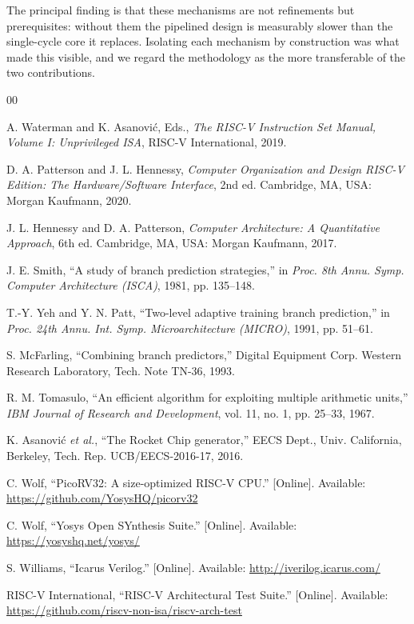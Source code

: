 \documentclass[conference]{IEEEtran}
\begin{document}
The principal finding is that these mechanisms are not refinements but
prerequisites: without them the pipelined design is measurably slower than
the single-cycle core it replaces. Isolating each mechanism by construction
was what made this visible, and we regard the methodology as the more
transferable of the two contributions.

\begin{thebibliography}{00}

 A. Waterman and K. Asanovi\'{c}, Eds., \emph{The RISC-V
Instruction Set Manual, Volume I: Unprivileged ISA}, RISC-V
International, 2019.

 D. A. Patterson and J. L. Hennessy, \emph{Computer
Organization and Design RISC-V Edition: The Hardware/Software Interface},
2nd ed. Cambridge, MA, USA: Morgan Kaufmann, 2020.

 J. L. Hennessy and D. A. Patterson, \emph{Computer
Architecture: A Quantitative Approach}, 6th ed. Cambridge, MA, USA: Morgan
Kaufmann, 2017.

 J. E. Smith, ``A study of branch prediction
strategies,'' in \emph{Proc. 8th Annu. Symp. Computer Architecture (ISCA)},
1981, pp. 135--148.

 T.-Y. Yeh and Y. N. Patt, ``Two-level adaptive
training branch prediction,'' in \emph{Proc. 24th Annu. Int. Symp.
Microarchitecture (MICRO)}, 1991, pp. 51--61.

 S. McFarling, ``Combining branch predictors,''
Digital Equipment Corp. Western Research Laboratory, Tech. Note TN-36,
1993.

 R. M. Tomasulo, ``An efficient algorithm for
exploiting multiple arithmetic units,'' \emph{IBM Journal of Research and
Development}, vol. 11, no. 1, pp. 25--33, 1967.

 K. Asanovi\'{c} \emph{et al.}, ``The Rocket Chip
generator,'' EECS Dept., Univ. California, Berkeley, Tech. Rep.
UCB/EECS-2016-17, 2016.

 C. Wolf, ``PicoRV32: A size-optimized RISC-V CPU.''
[Online]. Available: \url{https://github.com/YosysHQ/picorv32}

 C. Wolf, ``Yosys Open SYnthesis Suite.'' [Online].
Available: \url{https://yosyshq.net/yosys/}

 S. Williams, ``Icarus Verilog.'' [Online]. Available:
\url{http://iverilog.icarus.com/}

 RISC-V International, ``RISC-V Architectural Test
Suite.'' [Online]. Available:
\url{https://github.com/riscv-non-isa/riscv-arch-test}

\end{thebibliography}
\end{document}
